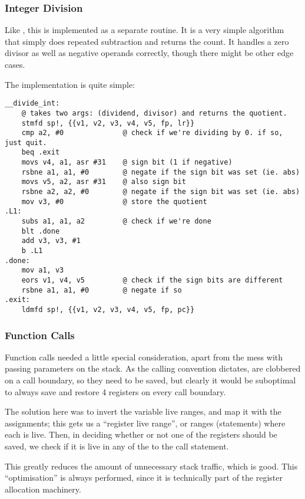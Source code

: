 \documentclass[12pt]{article}
\begin{document}
\subsubsection{Integer Division}

Like , this is implemented as a separate routine. It is a very simple algorithm that simply does repeated subtraction
and returns the count. It handles a zero divisor as well as negative operands correctly, though there might be other edge cases.

The implementation is quite simple:

\begin{verbatim}
__divide_int:
	@ takes two args: (dividend, divisor) and returns the quotient.
	stmfd sp!, {{v1, v2, v3, v4, v5, fp, lr}}
	cmp a2, #0              @ check if we're dividing by 0. if so, just quit.
	beq .exit
	movs v4, a1, asr #31    @ sign bit (1 if negative)
	rsbne a1, a1, #0        @ negate if the sign bit was set (ie. abs)
	movs v5, a2, asr #31    @ also sign bit
	rsbne a2, a2, #0        @ negate if the sign bit was set (ie. abs)
	mov v3, #0              @ store the quotient
.L1:
	subs a1, a1, a2         @ check if we're done
	blt .done
	add v3, v3, #1
	b .L1
.done:
	mov a1, v3
	eors v1, v4, v5         @ check if the sign bits are different
	rsbne a1, a1, #0        @ negate if so
.exit:
	ldmfd sp!, {{v1, v2, v3, v4, v5, fp, pc}}
\end{verbatim}



\subsubsection{Function Calls}

Function calls needed a little special consideration, apart from the mess with passing parameters on the stack. As
the calling convention dictates,  are clobbered on a call boundary, so they need to be saved, but clearly it
would be suboptimal to always save and restore 4 registers on every call boundary.

The solution here was to invert the variable live ranges, and map it with the assignments; this gets us a
\enquote{register live range}, or ranges (statements) where each  is live. Then, in deciding whether or not
one of the  registers should be saved, we check if it is live in any of the  to the call statement.

This greatly reduces the amount of unnecessary stack traffic, which is good. This \enquote{optimisation} is always
performed, since it is technically part of the register allocation machinery.
\end{document}
